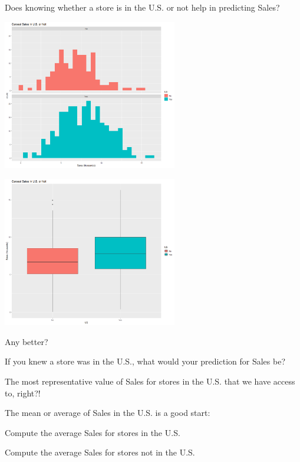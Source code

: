 \begin{frame}
\bi
	\item Does knowing whether a store is in the U.S. or not help in predicting Sales?
\ei
\pause
\begin{center}
	\includegraphics[width = 3in]{SalesUSHist.png}
\end{center}
\end{frame}

\begin{frame}
\begin{center}
	\includegraphics[width = 3in]{SalesUSBox.png}
\end{center}
\bi
	\item Any better?
\ei
\end{frame}

\begin{frame}
\bi
	\item If you knew a store was in the U.S., what would your prediction for Sales be?
	\pause
		\bi
			\item The most representative value of Sales for stores in the U.S. that we have access to, right?!
		\ei
	\pause
	
	\item The mean or average of Sales in the U.S. is a good start:
	\pause
		\bi
			\item Compute the average Sales for stores in the U.S.
			\item Compute the average Sales for stores not in the U.S.
		\ei
\ei
\end{frame}

